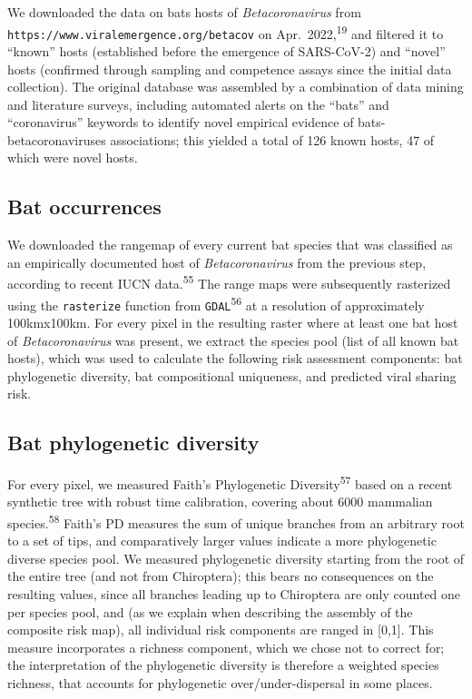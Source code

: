 \documentclass[11pt]{article}
\begin{document}
We downloaded the data on bats hosts of \emph{Betacoronavirus} from
\texttt{https://www.viralemergence.org/betacov} on
Apr.~2022,\textsuperscript{19} and filtered it to ``known'' hosts
(established before the emergence of SARS-CoV-2) and ``novel'' hosts
(confirmed through sampling and competence assays since the initial data
collection). The original database was assembled by a combination of
data mining and literature surveys, including automated alerts on the
``bats'' and ``coronavirus'' keywords to identify novel empirical
evidence of bats-betacoronaviruses associations; this yielded a total of
126 known hosts, 47 of which were novel hosts.

\hypertarget{bat-occurrences}{%
\subsection{Bat occurrences}\label{bat-occurrences}}

We downloaded the rangemap of every current bat species that was
classified as an empirically documented host of \emph{Betacoronavirus}
from the previous step, according to recent IUCN
data.\textsuperscript{55} The range maps were subsequently rasterized
using the \texttt{rasterize} function from
\texttt{GDAL}\textsuperscript{56} at a resolution of approximately
100kmx100km. For every pixel in the resulting raster where at least one
bat host of \emph{Betacoronavirus} was present, we extract the species
pool (list of all known bat hosts), which was used to calculate the
following risk assessment components: bat phylogenetic diversity, bat
compositional uniqueness, and predicted viral sharing risk.

\hypertarget{bat-phylogenetic-diversity}{%
\subsection{Bat phylogenetic
diversity}\label{bat-phylogenetic-diversity}}

For every pixel, we measured Faith's Phylogenetic
Diversity\textsuperscript{57} based on a recent synthetic tree with
robust time calibration, covering about 6000 mammalian
species.\textsuperscript{58} Faith's PD measures the sum of unique
branches from an arbitrary root to a set of tips, and comparatively
larger values indicate a more phylogenetic diverse species pool. We
measured phylogenetic diversity starting from the root of the entire
tree (and not from Chiroptera); this bears no consequences on the
resulting values, since all branches leading up to Chiroptera are only
counted one per species pool, and (as we explain when describing the
assembly of the composite risk map), all individual risk components are
ranged in {[}0,1{]}. This measure incorporates a richness component,
which we chose not to correct for; the interpretation of the
phylogenetic diversity is therefore a weighted species richness, that
accounts for phylogenetic over/under-dispersal in some places.
\end{document}
